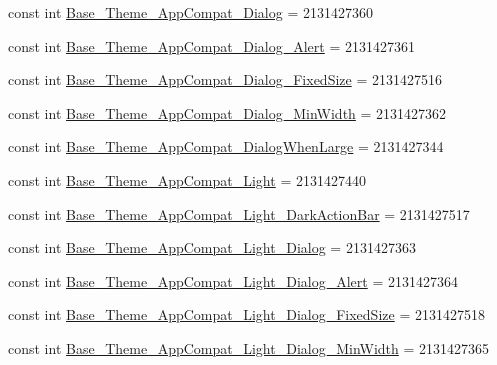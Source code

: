 \begin{DoxyCompactItemize}
\item 
const int \mbox{\hyperlink{class_f_w_p_s___app_1_1_droid_1_1_resource_1_1_style_a0525fa1c841fe8d37a579ef2fc973a2d}{Base\+\_\+\+Theme\+\_\+\+App\+Compat\+\_\+\+Dialog}} = 2131427360
\item 
const int \mbox{\hyperlink{class_f_w_p_s___app_1_1_droid_1_1_resource_1_1_style_a8d4a9ad009525fb019dbc8ee3569061b}{Base\+\_\+\+Theme\+\_\+\+App\+Compat\+\_\+\+Dialog\+\_\+\+Alert}} = 2131427361
\item 
const int \mbox{\hyperlink{class_f_w_p_s___app_1_1_droid_1_1_resource_1_1_style_a193ebeca0313f07a6106dbc49ed4397d}{Base\+\_\+\+Theme\+\_\+\+App\+Compat\+\_\+\+Dialog\+\_\+\+Fixed\+Size}} = 2131427516
\item 
const int \mbox{\hyperlink{class_f_w_p_s___app_1_1_droid_1_1_resource_1_1_style_af0bb3c17be122f729b2e64dbb617b8fd}{Base\+\_\+\+Theme\+\_\+\+App\+Compat\+\_\+\+Dialog\+\_\+\+Min\+Width}} = 2131427362
\item 
const int \mbox{\hyperlink{class_f_w_p_s___app_1_1_droid_1_1_resource_1_1_style_aa62ac2d86881e8620cc1070ca9dc6837}{Base\+\_\+\+Theme\+\_\+\+App\+Compat\+\_\+\+Dialog\+When\+Large}} = 2131427344
\item 
const int \mbox{\hyperlink{class_f_w_p_s___app_1_1_droid_1_1_resource_1_1_style_a7506b26b39d80fe9ab4b43e8b3759ee3}{Base\+\_\+\+Theme\+\_\+\+App\+Compat\+\_\+\+Light}} = 2131427440
\item 
const int \mbox{\hyperlink{class_f_w_p_s___app_1_1_droid_1_1_resource_1_1_style_afacf75e4dcb77263bbf15ce3e622216f}{Base\+\_\+\+Theme\+\_\+\+App\+Compat\+\_\+\+Light\+\_\+\+Dark\+Action\+Bar}} = 2131427517
\item 
const int \mbox{\hyperlink{class_f_w_p_s___app_1_1_droid_1_1_resource_1_1_style_a9b34457aec11ceb02300d1f0846460dc}{Base\+\_\+\+Theme\+\_\+\+App\+Compat\+\_\+\+Light\+\_\+\+Dialog}} = 2131427363
\item 
const int \mbox{\hyperlink{class_f_w_p_s___app_1_1_droid_1_1_resource_1_1_style_a4604463e4141f776befc93b175b85674}{Base\+\_\+\+Theme\+\_\+\+App\+Compat\+\_\+\+Light\+\_\+\+Dialog\+\_\+\+Alert}} = 2131427364
\item 
const int \mbox{\hyperlink{class_f_w_p_s___app_1_1_droid_1_1_resource_1_1_style_aa3e4578227898fa8161f5206bfaaac78}{Base\+\_\+\+Theme\+\_\+\+App\+Compat\+\_\+\+Light\+\_\+\+Dialog\+\_\+\+Fixed\+Size}} = 2131427518
\item 
const int \mbox{\hyperlink{class_f_w_p_s___app_1_1_droid_1_1_resource_1_1_style_a67730e66aa025e4e08359d3d0f9aa384}{Base\+\_\+\+Theme\+\_\+\+App\+Compat\+\_\+\+Light\+\_\+\+Dialog\+\_\+\+Min\+Width}} = 2131427365

\end{DoxyCompactItemize}

